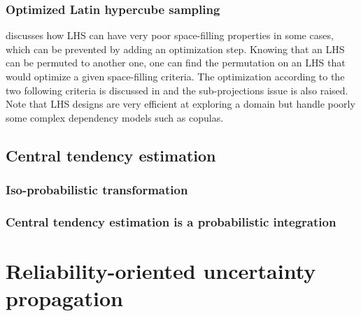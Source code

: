 
\subsubsection{Optimized Latin hypercube sampling}

\cite{franco_2008} discusses how LHS can have very poor space-filling properties in some cases, which can be prevented by adding an optimization step. 
Knowing that an LHS can be permuted to another one, one can find the permutation on an LHS that would optimize a given space-filling criteria. 
The optimization according to the two following criteria is discussed in \cite{damblin_couplet_2013} and the sub-projections issue is also raised. 
Note that LHS designs are very efficient at exploring a domain but handle poorly some complex dependency models such as copulas.


\subsection{Central tendency estimation}
\subsubsection{Iso-probabilistic transformation}

\subsubsection{Central tendency estimation is a probabilistic integration}



\section{Reliability-oriented uncertainty propagation}

